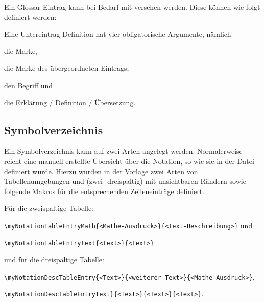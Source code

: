 Ein Glossar-Eintrag kann bei Bedarf mit  versehen werden.
Diese können wie folgt definiert werden:
\begin{latex}[caption={Definition eines Glossar-Untereintrages},label={lst:GlossSubentry}]
\end{latex}
Eine Untereintrag-Definition hat vier obligatorische Argumente, nämlich
\begin{itemize*}
\item die Marke,
\item die Marke des übergeordneten Eintrags,
\item den Begriff und
\item die Erklärung / Definition / Übersetzung.
\end{itemize*}


\subsection*{Symbolverzeichnis}%
%
%
%
%
\label{sec:Symbolverz}
%
Ein Symbolverzeichnis kann auf zwei Arten angelegt werden.
Normalerweise reicht eine manuell erstellte Übersicht über die Notation,
so wie sie in der Datei 
definiert wurde. Hierzu wurden in der Vorlage zwei Arten von Tabellenumgebungen
 und 
(zwei- \bzw dreispaltig) mit unsichtbaren Rändern sowie folgende Makros
für die entsprechenden Zeileneinträge definiert.

Für die zweispaltige Tabelle:
\begin{itemize*}
\item \lstinline|\myNotationTableEntryMath{<Mathe-Ausdruck>}{<Text-Beschreibung>}| und
\item \lstinline|\myNotationTableEntryText{<Text>}{<Text>}|
\end{itemize*}
und für die dreispaltige Tabelle:
\begin{itemize*}
\item \lstinline|\myNotationDescTableEntry{<Text>}{<weiterer Text>}{<Mathe-Ausdruck>}|,
\item \lstinline|\myNotationDescTableEntryText}{<Text>}{<Text>}{<Text>}|.
\end{itemize*}

